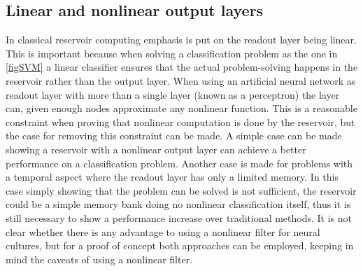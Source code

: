 \subsection{Linear and nonlinear output layers}
In classical reservoir computing emphasis is put on the readout layer being
linear.
This is important because when solving a classification problem as the one in
\ref{figSVM} a linear classifier ensures that the actual problem-solving happens
in the reservoir rather than the output layer.
When using an artificial neural network as readout layer with more than a single
layer (known as a perceptron) the layer can, given enough nodes approximate any
nonlinear function.
This is a reasonable constraint when proving that nonlinear computation is done
by the reservoir, but the case for removing this constraint can be made.
A simple case can be made showing a reservoir with a nonlinear output layer can
achieve a better performance on a classification problem.
Another case is made for problems with a temporal aspect where the readout layer
has only a limited memory.
In this case simply showing that the problem can be solved is not sufficient,
the reservoir could be a simple memory bank doing no nonlinear classification
itself, thus it is still necessary to show a performance increase over
traditional methods.
It is not clear whether there is any advantage to using a nonlinear filter for
neural cultures, but for a proof of concept both approaches can be employed,
keeping in mind the caveats of using a nonlinear filter.
\cleardoublepage

